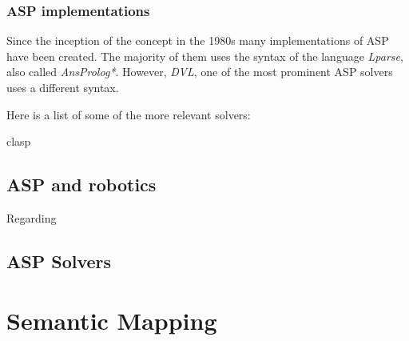\subsubsection{ASP implementations}
Since the inception of the concept in the 1980s \citep{Gelf88a} many implementations of ASP have been created.
The majority of them uses the syntax of the language \textit{Lparse}, also called \textit{AnsProlog*}. 
However, \textit{DVL}, one of the most prominent ASP solvers uses a different syntax.

Here is a list of some of the more relevant solvers:

\begin{description}
\item[clasp]
\end{description}


\subsection{ASP and robotics}
Regarding


















\subsection{ASP Solvers}

\section{Semantic Mapping}









% 

